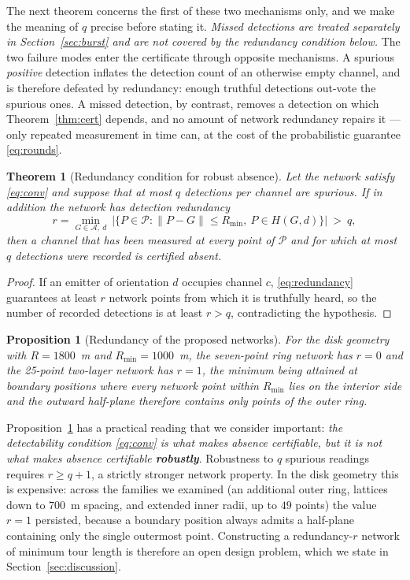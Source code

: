 \documentclass[journal,10pt]{IEEEtran}
\newtheorem{theorem}{Theorem}
\newtheorem{proposition}{Proposition}
\theoremstyle{definition}
\newcommand{\Rmin}{R_{\min}}
\newcommand{\bA}{\mathcal{A}}
\newcommand{\bP}{\mathcal{P}}
\begin{document}
The next theorem concerns the first of these two mechanisms only, and we make the meaning of $q$
precise before stating it. \emph{Missed detections are treated separately in
Section~\ref{sec:burst} and are not covered by the redundancy condition below.} The two failure
modes enter the certificate through opposite mechanisms. A spurious \emph{positive} detection
inflates the detection count of an otherwise empty channel, and is therefore defeated by
redundancy: enough truthful detections out-vote the spurious ones. A missed detection, by
contrast, removes a detection on which Theorem~\ref{thm:cert} depends, and no amount of network
redundancy repairs it --- only repeated measurement in time can, at the cost of the probabilistic
guarantee \eqref{eq:rounds}.

\begin{theorem}[Redundancy condition for robust absence]
\label{thm:redundancy}
Let the network satisfy \eqref{eq:conv} and suppose that at most $q$ detections per channel are
spurious. If in addition the network has \emph{detection redundancy}
\begin{equation}
r=\min_{G\in\bA,\ d}\ \bigl|\{P\in\bP:\|P-G\|\le\Rmin,\ P\in H(G,d)\}\bigr|\ >\ q,
\label{eq:redundancy}
\end{equation}
then a channel that has been measured at every point of $\bP$ and for which at most $q$
detections were recorded is certified absent.
\end{theorem}
\begin{proof}
If an emitter of orientation $d$ occupies channel $c$, \eqref{eq:redundancy} guarantees at least
$r$ network points from which it is truthfully heard, so the number of recorded detections is at
least $r>q$, contradicting the hypothesis.
\end{proof}

\begin{proposition}[Redundancy of the proposed networks]
\label{prop:r1}
For the disk geometry with $R=1800$~m and $\Rmin=1000$~m, the seven-point ring network has $r=0$
and the 25-point two-layer network has $r=1$, the minimum being attained at boundary positions
where every network point within $\Rmin$ lies on the interior side and the outward half-plane
therefore contains only points of the outer ring.
\end{proposition}

Proposition~\ref{prop:r1} has a practical reading that we consider important:
\emph{the detectability condition \eqref{eq:conv} is what makes absence certifiable, but it is not
what makes absence certifiable \textbf{robustly}}. Robustness to $q$ spurious readings requires
$r\ge q+1$, a strictly stronger network property. In the disk geometry this is expensive: across
the families we examined (an additional outer ring, lattices down to $700$~m spacing, and
extended inner radii, up to $49$ points) the value $r=1$ persisted, because a boundary position
always admits a half-plane containing only the single outermost point. Constructing a
redundancy-$r$ network of minimum tour length is therefore an open design problem, which we state
in Section~\ref{sec:discussion}.
\end{document}
